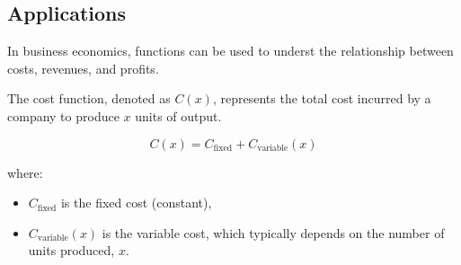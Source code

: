 \subsection{Applications}

In business economics, functions can be used to underst the relationship between costs, revenues, and profits. 








\begin{definition}

The cost function, denoted as \( C(x) \), represents the total cost incurred by a company to produce \( x \) units of output. 

\[
C(x) = C_{\text{fixed}} + C_{\text{variable}}(x)
\]

where:
\begin{itemize}
\item \( C_{\text{fixed}} \) is the fixed cost (constant),
\item \( C_{\text{variable}}(x) \) is the variable cost, which typically depends on the number of units produced, \( x \).
\end{itemize}

\end{definition}

